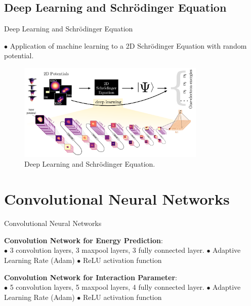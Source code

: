 \documentclass{beamer}
\begin{document}
\subsection{Deep Learning and Schr{\"o}dinger Equation}

\begin{frame}{Deep Learning and Schr{\"o}dinger Equation}

$\bullet$ Application of machine learning to a 2D Schr{\"o}dinger Equation with random potential.

\begin{figure}[Htb!]
\includegraphics[width=0.8\textwidth]{DPandSE.png}
\caption{\label{fig:DPandSE} Deep Learning and Schr{\"o}dinger Equation.}
\end{figure}

\end{frame}



\section{Convolutional Neural Networks}

\begin{frame}{Convolutional Neural Networks}

\large{\textbf{Convolution Network for Energy Prediction}}: \\
\vskip 0.3cm
$\bullet$ 3 convolution layers, 3 maxpool layers, 3 fully connected layer.
\vskip 0.2cm
$\bullet$ Adaptive Learning Rate (Adam)
\vskip 0.2cm
$\bullet$ ReLU activation function
\vskip 0.5cm


\large{\textbf{Convolution Network for Interaction Parameter}}: \\
\vskip 0.3cm
$\bullet$ 5 convolution layers, 5 maxpool layers, 4 fully connected layer.
\vskip 0.2cm
$\bullet$ Adaptive Learning Rate (Adam)
\vskip 0.2cm
$\bullet$ ReLU activation function



\end{frame}
\end{document}
